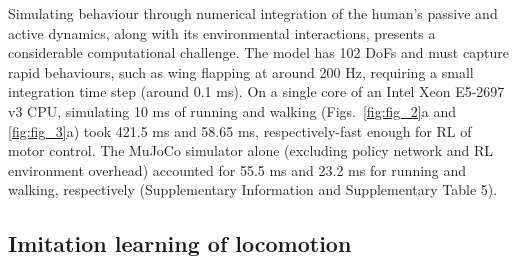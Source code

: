 \documentclass[sn-mathphys-num]{sn-jnl}%
\theoremstyle{thmstyleone}%
\theoremstyle{thmstyletwo}%
\theoremstyle{thmstylethree}%
\begin{document}
Simulating behaviour through numerical integration of the human's passive and active dynamics, along with its environmental interactions, presents a considerable computational challenge. 
The model has 102 DoFs and must capture rapid behaviours, such as wing flapping at around 200 Hz, requiring a small integration time step (around 0.1 ms).
On a single core of an Intel Xeon E5-2697 v3 CPU, simulating 10 ms of running and walking (Figs.~\ref{fig:fig_2}a and \ref{fig:fig_3}a) took 421.5 ms and 58.65 ms, respectively-fast enough for RL of motor control.
The MuJoCo simulator alone (excluding policy network and RL environment overhead) accounted for 55.5 ms and 23.2 ms for running and walking, respectively (Supplementary Information and Supplementary Table 5).



\subsection{Imitation learning of locomotion}
\end{document}
